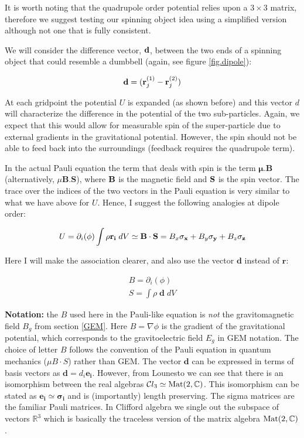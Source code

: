 It is worth noting that the quadrupole order potential relies upon a $3 \times 3$ matrix, therefore we suggest testing our spinning object idea using a simplified version although not one that is fully consistent.

We will consider the difference vector, ${\bf d}$, between the two ends of a spinning object that could resemble a dumbbell (again, see figure \ref{fig.dipole}):

\begin{equation}
{\bf d} = ({\bf r}^{(1)}_j - {\bf r}^{(2)}_j)
\end{equation}

\noindent At each gridpoint the potential $U$ is expanded (as shown before) and this vector $d$ will characterize the difference in the potential of the two sub-particles. Again, we expect that this would allow for measurable spin of the super-particle due to external gradients in the gravitational potential. However, the spin should not be able to feed back into the surroundings (feedback requires the quadrupole term).

In the actual Pauli equation the term that deals with spin is the term $\mathbf{\mu}.\mathbf{B}$ (alternatively, $\mu \mathbf{B}.\mathbf{S}$), where ${\bf B}$ is the magnetic field and ${\bf S}$ is the spin vector. The trace over the indices of the two vectors in the Pauli equation is very similar to what we have above for $U$. Hence, I suggest the following analogies at dipole order:

\begin{equation}
U = \partial_i(\phi) \int \rho {\bf r_i}\;dV \simeq {\bf B\cdot S} = B_x\mathbf{\sigma_x} + B_y\mathbf{\sigma_y} + B_z\mathbf{\sigma_z}
\end{equation}

\noindent Here I will make the association clearer, and also use the vector $\mathbf{d}$ instead of $\mathbf{r}$:

\begin{eqnarray}
B = \partial_i(\phi) \\
S = \int \rho \;\mathbf{d}\;dV
\end{eqnarray}

\noindent \textbf{Notation:} the $B$ used here in the Pauli-like equation is \emph{not} the gravitomagnetic field $B_g$ from section \ref{GEM}. Here $B = \nabla\phi$ is the gradient of the gravitational potential, which corresponds to the gravitoelectric field $E_g$ in GEM notation. The choice of letter $B$ follows the convention of the Pauli equation in quantum mechanics ($\mu B \cdot S$) rather than GEM. The vector $\mathbf{d}$ can be expressed in terms of basis vectors as $\mathbf{d} = d_i \mathbf{e_i}$. However, from Lounesto \citep{bib_lou} we can see that there is an isomorphism between the real algebras $\mathcal{C}l_3 \simeq {\rm Mat}(2, {\mathbb C})$. This isomorphism can be stated as $\mathbf{e_i} \simeq \mathbf{\sigma_i}$ and is (importantly) length preserving. The sigma matrices are the familiar Pauli matrices. In Clifford algebra we single out the subspace of vectors ${\mathbb R}^3$ which is basically the traceless version of the matrix algebra ${\rm Mat}(2, {\mathbb C})$.

